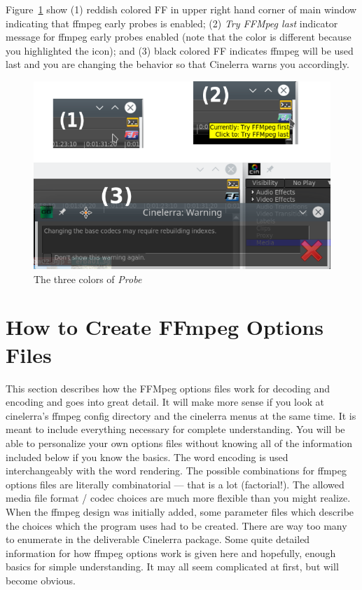 Figure~\ref{fig:ff} show (1) reddish colored FF in upper right hand corner of main window indicating
that ffmpeg early probes is enabled; (2) \textit{Try FFMpeg last}  indicator message for ffmpeg early probes enabled (note that the color is different because you highlighted the icon); and (3) black colored FF indicates ffmpeg will be used last and you are changing the behavior so that Cinelerra warns you accordingly.

\begin{figure}[htpb]
    \centering
    \includegraphics[width=0.7\linewidth]{images/ff.png}
    \caption{The three colors of \textit{Probe}}
    \label{fig:ff}
\end{figure}

\section{How to Create FFmpeg Options Files}%
\label{sec:create_ffmpeg_options_files}

This section describes how the FFMpeg options files work for decoding and encoding and goes into great detail.  It will make more sense if you look at cinelerra's ffmpeg config directory and the cinelerra menus at the same time.  It is meant to include everything necessary for complete understanding.  You will be able to personalize your own options files without knowing all of the information included below if you know the basics.  The word encoding is used interchangeably with the word rendering.
The possible combinations for ffmpeg options files are literally combinatorial --- that is a lot (factorial!).  The allowed media file format / codec choices are much more flexible than you might realize.  When the ffmpeg design was initially added, some parameter files which describe the choices which the program uses had to be created.  There are way too many to enumerate in the deliverable Cinelerra package.  Some quite detailed information for how ffmpeg options work is given here and hopefully, enough basics for simple understanding.  It may all seem complicated at first, but will become obvious.

